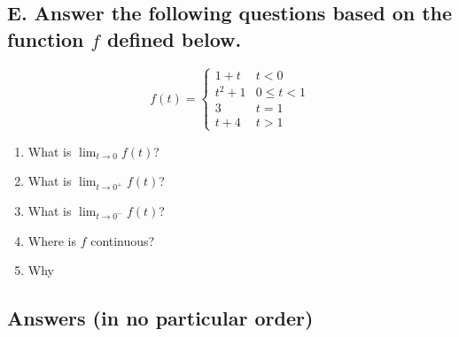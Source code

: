 \documentclass{article}
\begin{document}
\subsection*{E. Answer the following questions based on the function $f$ defined below.}
\begin{multicols}{3}
$$f(t)=\begin{cases}
1+t & t<0 \\
t^2+1 & 0 \leq t<1 \\ 
3 & t=1 \\
t+4 & t>1
\end{cases}$$
\begin{enumerate}
\item What is $\displaystyle\lim_{t\to 0}f(t)$?
\item What is $\displaystyle\lim_{t\to 0^+}f(t)$?
\item What is $\displaystyle\lim_{t\to 0^-}f(t)$?
\item Where is $f$ continuous?
\item Why 
\end{enumerate}
\end{multicols}


\newpage

\subsection*{Answers (in no particular order)}
\end{document}
